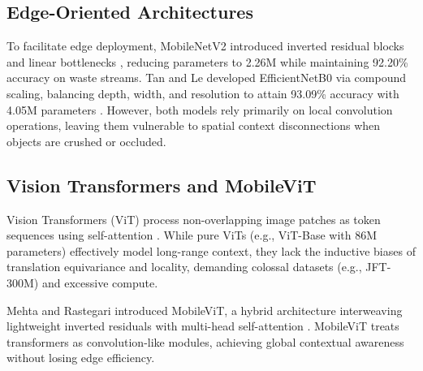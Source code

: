 \documentclass[conference]{IEEEtran}
\begin{document}
\subsection{Edge-Oriented Architectures}
To facilitate edge deployment, MobileNetV2 introduced inverted residual blocks and linear bottlenecks \cite{sandler2018mobilenetv2}, reducing parameters to 2.26M while maintaining 92.20\% accuracy on waste streams. Tan and Le developed EfficientNetB0 via compound scaling, balancing depth, width, and resolution to attain 93.09\% accuracy with 4.05M parameters \cite{tan2019efficientnet}. However, both models rely primarily on local convolution operations, leaving them vulnerable to spatial context disconnections when objects are crushed or occluded.

\subsection{Vision Transformers and MobileViT}
Vision Transformers (ViT) process non-overlapping image patches as token sequences using self-attention \cite{dosovitskiy2020image}. While pure ViTs (e.g., ViT-Base with 86M parameters) effectively model long-range context, they lack the inductive biases of translation equivariance and locality, demanding colossal datasets (e.g., JFT-300M) and excessive compute. 

Mehta and Rastegari introduced MobileViT, a hybrid architecture interweaving lightweight inverted residuals with multi-head self-attention \cite{mehta2022mobilevit}. MobileViT treats transformers as convolution-like modules, achieving global contextual awareness without losing edge efficiency.
\end{document}
